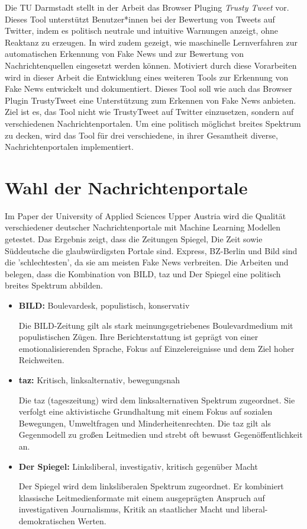 Die TU Darmstadt stellt in der Arbeit \cite{Hartwig2021} das Browser Pluging \textit{Trusty Tweet} vor. Dieses Tool unterstützt Benutzer*innen bei der Bewertung von
Tweets auf Twitter, indem es politisch neutrale und intuitive Warnungen anzeigt, ohne Reaktanz zu erzeugen. 
In \cite{Simone2022} wird zudem gezeigt, wie maschinelle Lernverfahren zur automatischen Erkennung von Fake News und zur Bewertung von Nachrichtenquellen eingesetzt werden können.
Motiviert durch diese Vorarbeiten wird in dieser Arbeit die Entwicklung eines weiteren Tools zur Erkennung von Fake News entwickelt und dokumentiert.
Dieses Tool soll wie auch das Browser Plugin TrustyTweet eine Unterstützung zum Erkennen von Fake News anbieten.
Ziel ist es, das Tool nicht wie TrustyTweet auf Twitter einzusetzen, sondern auf verschiedenen Nachrichtenportalen.
Um eine politisch möglichst breites Spektrum zu decken, wird das Tool für drei verschiedene, in ihrer Gesamtheit diverse, Nachrichtenportalen implementiert.

\section{Wahl der Nachrichtenportale}
\label{sec:wahl_nachrichtenportale}

Im Paper der University of Applied Sciences Upper Austria \cite{Simone2022} wird die Qualität verschiedener deutscher Nachrichtenportale mit 
Machine Learning Modellen getestet. 
Das Ergebnis zeigt, dass die Zeitungen Spiegel, Die Zeit sowie Süddeutsche die glaubwürdigsten Portale sind. Express, BZ-Berlin und Bild sind die 'schlechtesten', da sie
am meisten Fake News verbreiten.
Die Arbeiten \cite{henke2024nachrichten, Lieb2023} und \cite{Osing2022} belegen, dass die Kombination von BILD, taz und Der Spiegel eine politisch 
breites Spektrum abbilden.

\begin{itemize}
    \item \textbf{BILD:} Boulevardesk, populistisch, konservativ
   
    Die BILD-Zeitung gilt als stark meinungsgetriebenes Boulevardmedium mit populistischen Zügen. Ihre Berichterstattung ist geprägt von einer emotionalisierenden Sprache, 
    Fokus auf Einzelereignisse und dem Ziel hoher Reichweiten.

    \item \textbf{taz:} Kritisch, linksalternativ, bewegungsnah
    
    Die taz (tageszeitung) wird dem linksalternativen Spektrum zugeordnet. Sie verfolgt eine aktivistische Grundhaltung mit einem Fokus auf 
    sozialen Bewegungen, Umweltfragen und Minderheitenrechten. 
    Die taz gilt als Gegenmodell zu großen Leitmedien und strebt oft bewusst Gegenöffentlichkeit an.

    \item \textbf{Der Spiegel:} Linksliberal, investigativ, kritisch gegenüber Macht
    
    Der Spiegel wird dem linksliberalen Spektrum zugeordnet. Er kombiniert klassische Leitmedienformate mit einem ausgeprägten Anspruch auf 
    investigativen Journalismus, Kritik an staatlicher Macht und liberal-demokratischen Werten.
\end{itemize}

